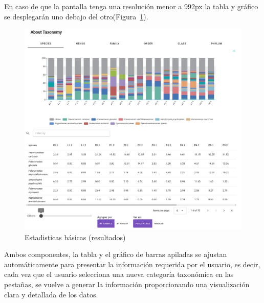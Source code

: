 En caso de que la pantalla tenga una resolución menor a 992px la tabla y gráfico se desplegarán uno debajo del otro(Figura~\ref{fig:app-results-taxonomy-small-dev}).
\begin{figure}[H]
    \centering
    \includegraphics[width=0.8\linewidth]{images/app/results/taxonomy_small_dev.png}

    \caption{Estadisticas básicas (resultados)}
    \label{fig:app-results-taxonomy-small-dev}
\end{figure}

Ambos componentes, la tabla y el gráfico de barras apiladas se ajustan automáticamente para presentar la información requerida por el usuario, es decir, cada vez que el usuario selecciona una nueva categoría taxonómica en las pestañas, se vuelve a generar la información proporcionando una visualización clara y detallada de los datos.







